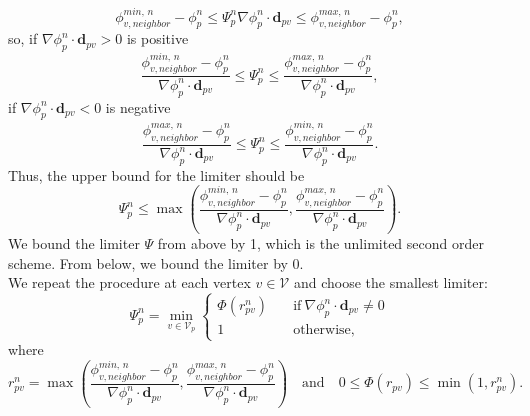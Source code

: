\documentclass{article}
\begin{document}
\[ \phi_{v, neighbor}^{min,\,n} - \phi_p^{n} \leq  \Psi_p^{n}\nabla\phi_p^{n}\cdot\boldsymbol{d}_{pv} \leq \phi_{v, neighbor}^{max,\,n} - \phi_p^{n}, \]
so, if $ \nabla\phi_p^{n}\cdot\boldsymbol{d}_{pv} > 0 $ is positive
\[ \frac{\phi_{v, neighbor}^{min,\,n} - \phi_p^{n}}{\nabla\phi_p^{n}\cdot\boldsymbol{d}_{pv}} \leq  \Psi_p^{n} \leq \frac{\phi_{v, neighbor}^{max,\,n} - \phi_p^{n}}{\nabla\phi_p^{n}\cdot\boldsymbol{d}_{pv}}, \]
if $ \nabla\phi_p^{n}\cdot\boldsymbol{d}_{pv} < 0 $ is negative
\[ \frac{\phi_{v, neighbor}^{max,\,n} - \phi_p^{n}}{\nabla\phi_p^{n}\cdot\boldsymbol{d}_{pv}} \leq  \Psi_p^{n} \leq \frac{\phi_{v, neighbor}^{min,\,n} - \phi_p^{n}}{\nabla\phi_p^{n}\cdot\boldsymbol{d}_{pv}}. \]
Thus, the upper bound for the limiter should be
\[ \Psi_p^{n} \leq \max \left(\frac{\phi_{v, neighbor}^{min,\,n} -\phi_p^{n}}{\nabla\phi_p^n \cdot \boldsymbol{d}_{pv}}, \frac{\phi_{v, neighbor}^{max,\,n} -\phi_p^{n}}{\nabla\phi_p^n \cdot \boldsymbol{d}_{pv}}\right). \]
We bound the limiter $ \Psi $ from above by 1, which is the unlimited second order scheme. From below, we bound the limiter by 0.\\
We repeat the procedure at each vertex $ v\in\mathcal{V} $ and choose the smallest limiter:
\begin{equation}
	\Psi_p^n = \min_{v \in \mathcal{V}_p}
	\begin{cases}
		\Phi(r_{pv}^n) \quad &\text{if} \ \nabla\phi_p^{n}\cdot\boldsymbol{d}_{pv} \neq 0\\
		1 \quad &\text{otherwise},
	\end{cases}
\end{equation}
where
\[ r_{pv}^n = \max \left(\frac{\phi_{v, neighbor}^{min,\,n} -\phi_p^{n}}{\nabla\phi_p^n \cdot \boldsymbol{d}_{pv}}, \frac{\phi_{v, neighbor}^{max,\,n} -\phi_p^{n}}{\nabla\phi_p^n \cdot \boldsymbol{d}_{pv}}\right) \quad\text{and}\quad
0 \leq \Phi(r_{pv}) \leq \min(1, r_{pv}^n). \]
\newpage
\end{document}
